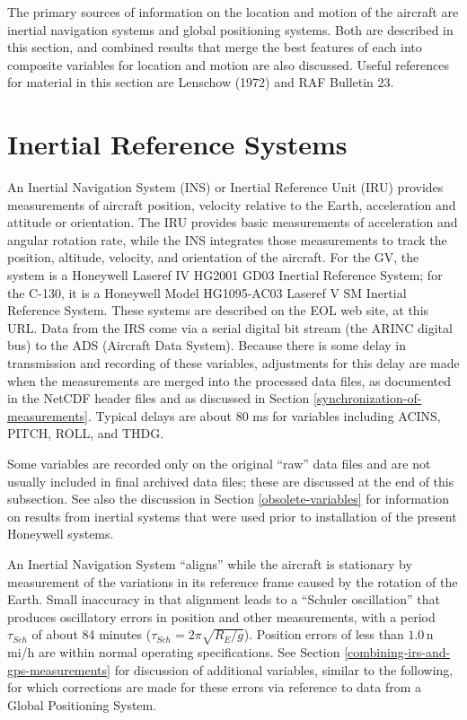 \documentclass[
]{book}
\begin{document}
The primary sources of information on the location and motion of the aircraft are inertial navigation systems and global positioning systems. Both are described in this section, and combined results that merge the best features of each into composite variables for location and motion are also discussed. Useful references for material in this section are Lenschow (1972) and RAF Bulletin 23.

\hypertarget{inertial-reference-systems}{%
\section{Inertial Reference Systems}\label{inertial-reference-systems}}

An Inertial Navigation System (INS) or Inertial Reference Unit (IRU) provides measurements of aircraft position, velocity relative to the Earth, acceleration and attitude or orientation. The IRU provides basic measurements of acceleration and angular rotation rate, while the INS integrates those measurements to track the position, altitude, velocity, and orientation of the aircraft. For the GV, the system is a Honeywell Laseref IV HG2001 GD03 Inertial Reference System; for the C-130, it is a Honeywell Model HG1095-AC03 Laseref V SM Inertial Reference System. These systems are described on the EOL web site, at this URL. Data from the IRS come via a serial digital bit stream (the ARINC digital bus) to the ADS (Aircraft Data System). Because there is some delay in transmission and recording of these variables, adjustments for this delay are made when the measurements are merged into the processed data files, as documented in the NetCDF header files and as discussed in Section \ref{synchronization-of-measurements}. Typical delays are about 80 ms for variables including ACINS, PITCH, ROLL, and THDG.

Some variables are recorded only on the original ``raw'' data files and are not usually included in final archived data files; these are discussed at the end of this subsection. See also the discussion in Section \ref{obsolete-variables} for information on results from inertial systems that were used prior to installation of the present Honeywell systems.

An Inertial Navigation System ``aligns'' while the aircraft is stationary by measurement of the variations in its reference frame caused by the rotation of the Earth. Small inaccuracy in that alignment leads to a ``Schuler oscillation'' that produces oscillatory errors in position and other measurements, with a period \(\tau_{Sch}\) of about 84 minutes (\(\tau_{Sch}=2\pi\sqrt{R_{E}/g}\)). Position errors of less than \(1.0\,\)n mi/h are within normal operating specifications. See Section \ref{combining-irs-and-gps-measurements} for discussion of additional variables, similar to the following, for which corrections are made for these errors via reference to data from a Global Positioning System.
\end{document}
